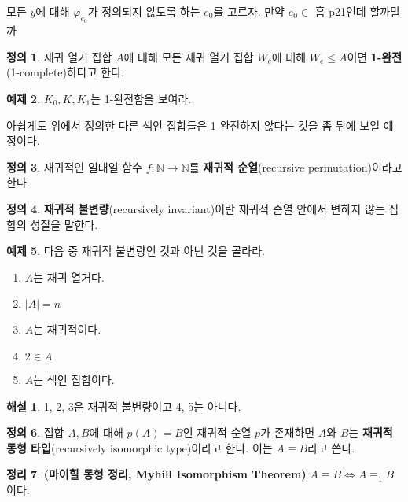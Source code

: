 \documentclass[b5paper, 11pt]{book}
\theoremstyle{definition}
\newtheorem{defn}{정의}[chapter]
\newtheorem{thm}[defn]{정리}
\newtheorem{ex}[defn]{예제}
\newtheorem*{ans*}{해설}
\newenvironment{pf*}{\pushQED{\qed}\pf}
{\popQED\endpf}
\begin{document}
\begin{pf*}
    모든 $y$에 대해 $\varphi_{e_0}$가 정의되지 않도록 하는 $e_0$를 고르자. 만약 $e_0 \in $ 흠 p21인데 할까말까
\end{pf*}
\begin{defn}
    재귀 열거 집합 $A$에 대해 모든 재귀 열거 집합 $W_e$에 대해 $W_e \le A$이면 \textbf{1-완전}(1-complete)하다고 한다. 
\end{defn}
\begin{ex}
    $K_0, K, K_1$는 1-완전함을 보여라. 
\end{ex}
아쉽게도 위에서 정의한 다른 색인 집합들은 1-완전하지 않다는 것을 좀 뒤에 보일 예정이다.
\begin{defn}
    재귀적인 일대일 함수 $f: \mathbb{N} \rightarrow \mathbb{N}$를 \textbf{재귀적 순열}(recursive permutation)이라고 한다.
\end{defn}
\begin{defn}
    \textbf{재귀적 불변량}(recursively invariant)이란 재귀적 순열 안에서 변하지 않는 집합의 성질을 말한다.
\end{defn}
\begin{ex}
    다음 중 재귀적 불변량인 것과 아닌 것을 골라라.
    \begin{enumerate}
        \item $A$는 재귀 열거다.
        \item $\vert A \vert = n$
        \item $A$는 재귀적이다.
        \item $2 \in A$
        \item $A$는 색인 집합이다.
    \end{enumerate}
\end{ex}
\begin{ans*}
    1, 2, 3은 재귀적 불변량이고 4, 5는 아니다.
\end{ans*}
\begin{defn}
    집합 $A, B$에 대해 $p(A) = B$인 재귀적 순열 $p$가 존재하면 $A$와 $B$는 \textbf{재귀적 동형 타입}(recursively isomorphic type)이라고 한다. 이는 $A \equiv B$라고 쓴다. 
\end{defn}
\begin{thm}
    \textbf{(마이힐 동형 정리, Myhill Isomorphism Theorem)} $A \equiv B \Leftrightarrow A \equiv_1 B$이다.
\end{thm}
\end{document}
